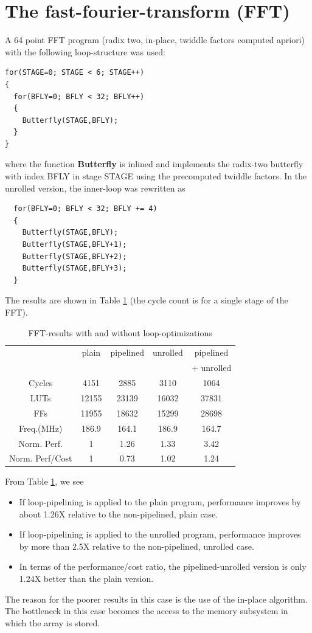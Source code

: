 \documentclass[conference]{IEEEtran}
\begin{document}
\section{The fast-fourier-transform (FFT)}

A 64 point FFT program (radix two, in-place, twiddle factors computed
apriori) with the following loop-structure was used:
\begin{verbatim}
for(STAGE=0; STAGE < 6; STAGE++)
{
  for(BFLY=0; BFLY < 32; BFLY++)
  {
    Butterfly(STAGE,BFLY);
  }
}
\end{verbatim} 
where the function {\bf Butterfly} is inlined and implements
the radix-two butterfly with index BFLY in stage STAGE using
the precomputed twiddle factors.
In the unrolled version, the inner-loop was rewritten as
\begin{verbatim}
  for(BFLY=0; BFLY < 32; BFLY += 4)
  {
    Butterfly(STAGE,BFLY);
    Butterfly(STAGE,BFLY+1);
    Butterfly(STAGE,BFLY+2);
    Butterfly(STAGE,BFLY+3);
  }
\end{verbatim}

The results are shown in Table \ref{table:fft} (the cycle count is for a single
stage of the FFT).
\begin{table}[htb]
  \centering
  \caption{FFT-results  with and without loop-optimizations}
  \label{table:fft}
  \renewcommand\arraystretch{1.2}
  \setlength{\tabcolsep}{1ex}
  \begin{tabular}{c|c|c|c|c}
  \hline
  & plain & pipelined & unrolled & pipelined  \\
  &       &           &          & + unrolled\\
  \hline

Cycles   &    4151  &   2885   &     3110  &     1064 \\
LUTs     &   12155   &  23139  &     16032  &    37831 \\
FFs      &    11955  &  18632  &     15299  &    28698 \\
Freq.(MHz)  & 186.9  &    164.1 &      186.9 &    164.7 \\
Norm. Perf. & 1      &  1.26  & 1.33 & 3.42 \\
Norm. Perf/Cost & 1  &  0.73  & 1.02 & 1.24 \\
\hline
  \end{tabular}
\end{table}
From Table \ref{table:fft}, we see 
\begin{itemize}
\item If loop-pipelining is 
applied to the plain program, performance improves
by about 1.26X relative to the non-pipelined, plain case.
\item If loop-pipelining is applied to the unrolled program,
performance improves by more than 2.5X relative to the non-pipelined,
unrolled case.  
\item In terms of the performance/cost
ratio, the pipelined-unrolled version is only 1.24X better than
the plain version.   
\end{itemize}
The reason for the poorer results in this case is the use of the in-place
algorithm.  The bottleneck in this case becomes the access to the memory
subsystem in which the array is stored. 
\end{document}
